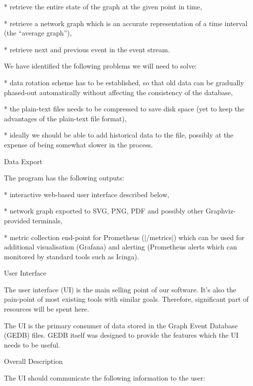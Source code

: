 \begitems

* retrieve the entire state of the graph at the given point in time,

* retrieve a network graph which is an accurate representation of a time
interval (the ``average graph''),

* retrieve next and previous event in the event stream.

\enditems

We have identified the following problems we will need to solve:

\begitems

* data rotation scheme has to be established, so that old data can be gradually
phased-out automatically without affecting the consistency of the database,

* the plain-text files needs to be compressed to save disk space (yet to keep
the advantages of the plain-text file format),

* ideally we should be able to add historical data to the file, possibly at the
expense of being somewhat slower in the process.

\enditems


\sec Data Export

The program has the following outputs:

\begitems

* interactive web-based user interface described below,

* network graph exported to SVG, PNG, PDF and possibly other Graphviz-provided
terminals,

* metric collection end-point for Prometheus (|/metrics|) which can be used for
additional visualisation (Grafana) and alerting (Prometheus alerts which can
monitored by standard tools such as Icinga).

\enditems



\sec User Interface

The user interface (UI) is the main selling point of our software. It's also
the pain-point of most existing tools with similar goals. Therefore, significant
part of resources will be spent here.

The UI is the primary consumer of data stored in the Graph Event Database
(GEDB) files. GEDB itself was designed to provide the features which the UI
needs to be useful.

\secc Overall Description

The UI should communicate the following information to the user:

